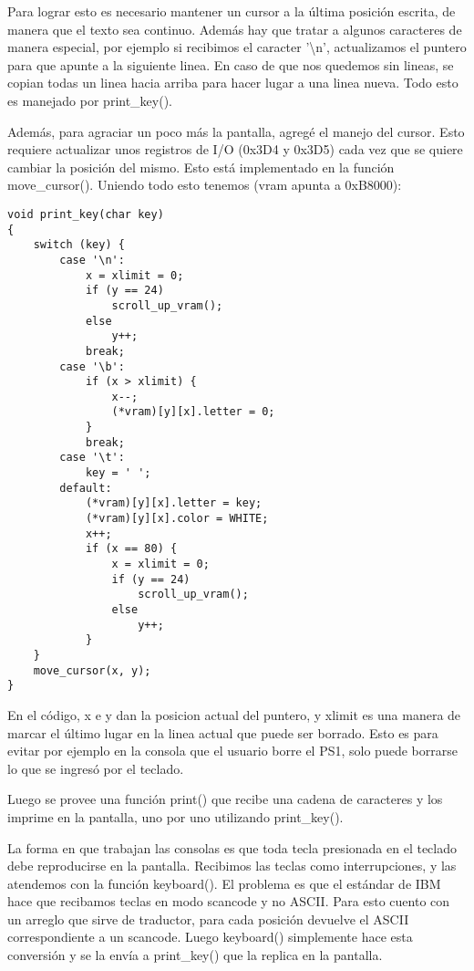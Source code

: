 Para lograr esto es necesario mantener un cursor a la última posición escrita,
de manera que el texto sea continuo. Además hay que tratar a algunos caracteres
de manera especial, por ejemplo si recibimos el caracter '\textbackslash n',
actualizamos el puntero para que apunte a la siguiente linea. En caso de que
nos quedemos sin lineas, se copian todas un linea hacia arriba para hacer
lugar a una linea nueva. Todo esto es manejado por print\_key().

Además, para agraciar un poco más la pantalla, agregé el manejo del cursor.
Esto requiere actualizar unos registros de I/O (0x3D4 y 0x3D5) cada vez que se
quiere cambiar la posición del mismo. Esto está implementado en la función
move\_cursor(). Uniendo todo esto tenemos (vram apunta a 0xB8000):

\begin{verbatim}
void print_key(char key)
{
    switch (key) {
        case '\n':
            x = xlimit = 0;
            if (y == 24)
                scroll_up_vram();
            else
                y++;
            break;
        case '\b':
            if (x > xlimit) {
                x--;
                (*vram)[y][x].letter = 0;
            }
            break;
        case '\t':
            key = ' ';
        default:
            (*vram)[y][x].letter = key;
            (*vram)[y][x].color = WHITE;
            x++;
            if (x == 80) {
                x = xlimit = 0;
                if (y == 24)
                    scroll_up_vram();
                else
                    y++;
            }
    }
    move_cursor(x, y);
}
\end{verbatim}

En el código, x e y dan la posicion actual del puntero, y xlimit es una manera
de marcar el último lugar en la linea actual que puede ser borrado. Esto es
para evitar por ejemplo en la consola que el usuario borre el PS1, solo puede
borrarse lo que se ingresó por el teclado.

Luego se provee una función print() que recibe una cadena de caracteres y los
imprime en la pantalla, uno por uno utilizando print\_key().

La forma en que trabajan las consolas es que toda tecla presionada en el
teclado debe reproducirse en la pantalla. Recibimos las teclas como
interrupciones, y las atendemos con la función keyboard(). El problema es que el
estándar de IBM hace que recibamos teclas en modo scancode y no ASCII. Para
esto cuento con un arreglo que sirve de traductor, para cada posición devuelve
el ASCII correspondiente a un scancode. Luego keyboard() simplemente hace esta
conversión y se la envía a print\_key() que la replica en la pantalla.

